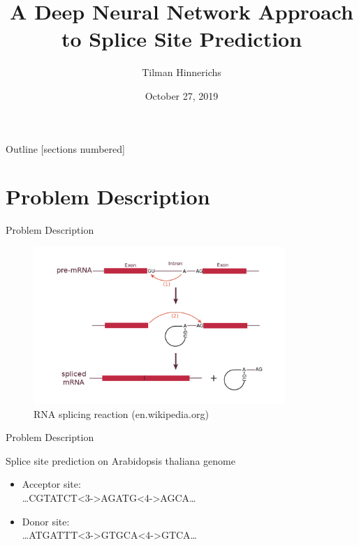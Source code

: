 \documentclass[10pt]{beamer}
\title{A Deep Neural Network Approach to Splice Site Prediction}
\author{Tilman Hinnerichs}
\institute{Knowledge Mining Lab -- KAUST}
\date{October 27, 2019}
\begin{document}
	
\begin{frame}
	\titlepage
\end{frame}

\begin{frame}{Outline}
	[sections numbered]
	\tableofcontents
\end{frame}

\section{Problem Description}
\begin{frame}{Problem Description}
	\begin{figure}[ht]
		\centering
		\includegraphics[width = 0.85\textwidth]{RNA_splicing_reaction.png}
		\caption{RNA splicing reaction (en.wikipedia.org)}
	\end{figure}
\end{frame}

\begin{frame}{Problem Description}
	
	\large Splice site prediction on Arabidopsis thaliana genome
	\vspace{0.5cm}
	\pause
	\begin{exampleblock}{}
		\begin{itemize}
			\item Acceptor site:\\
			\dots CGTATCT<3->{AG}ATG<4->{AG}CA\dots
			\item Donor site:\\
			\dots ATGATTT<3->{GT}GCA<4->{GT}CA\dots
			
		\end{itemize}
	\end{exampleblock}
	
\end{frame}
\end{document}
